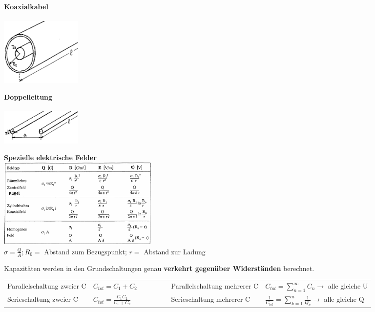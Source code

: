 \parbox[t]{4.5cm}{\textbf{Koaxialkabel} \\ \vspace{.2cm} \\ \includegraphics[width=4cm]
	{./bilder/e-c-koaxialkabel.png}}
\parbox[t]{4.5cm}{\textbf{Doppelleitung} \\ \vspace{.2cm} \\ \includegraphics[width=4cm]
	{./bilder/e-c-paralleldraht.png}}
\parbox[t]{10cm}{\textbf{Spezielle elektrische Felder} \\ \includegraphics[width=8cm]	
	{./bilder/e-c-speziellefelder.png} \\
	$\sigma = \frac{Q}{A}; R_0 =$ Abstand zum Bezugspunkt; $r =$ Abstand zur Ladung}


Kapazitäten werden in den Grundschaltungen genau \textbf{verkehrt gegenüber Widerständen} berechnet.\\
\begin{tabular}{llll}
Parallelschaltung zweier C
	& $C_{tot} = C_1 + C_2 \qquad \qquad $ 
	& Parallelschaltung mehrerer C 
	& $C_{tot} = \sum\limits_{n=1}^\infty C_n \rightarrow$ alle gleiche U 	\\
Serieschaltung zweier C
	& $C_{tot} = \frac{C_1 C_2}{C_1 + C_2}$
	& Serieschaltung mehrerer C
	& $\frac{1}{C_{tot}} = \sum\limits^n_{k=1} \frac{1}{Q_k} \rightarrow$ alle gleiche Q 
\end{tabular}


